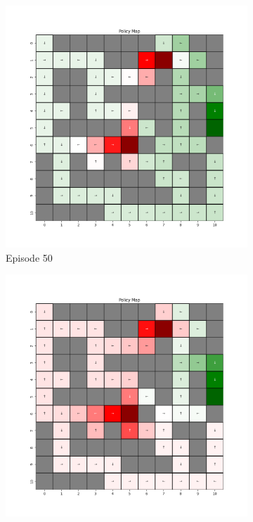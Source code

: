 \documentclass{assignment}
\begin{document}
\begin{figure}[H]
\begin{subfigure}{0.3\textwidth}
        \includegraphics[width=\textwidth]{figures/policy_td/epsilon_sweep/policy_alpha_0.1_gamma_0.95_epsilon_0.8_iteration_50.png}
    \caption{Episode 50}
    \end{subfigure}\hfill
    \begin{subfigure}{0.3\textwidth}
        \includegraphics[width=\textwidth]{figures/policy_td/epsilon_sweep/policy_alpha_0.1_gamma_0.95_epsilon_0.8_iteration_100.png}

\end{subfigure}
\end{figure}
\end{document}
